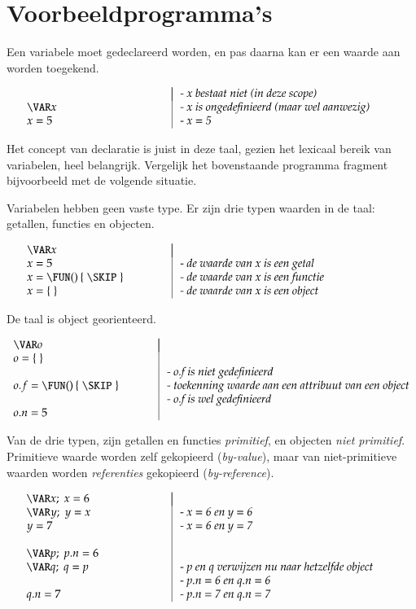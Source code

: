 \documentclass
  [11pt,
   paper=a4,
   cleardouble=plain,
   chapterprefix=true,
   parskip=half]
  {scrbook}
\makeatletter
\newcommand{\<}
  {\ensuremath{\langle}}
\renewcommand{\>}
  {\ensuremath{\rangle}}
\newenvironment{SyntaxExample}{%
\vspace{-1.6pc}%
	\begin{equation*}%
		\begin{array}{l@{\hspace*{.02\textwidth}}|@{\hspace*{.02\textwidth}}l}%
		\hspace*{.35\textwidth} & \hspace*{.55\textwidth} \\[-1pc]%
}{%
		\end{array}%
	\end{equation*}%
\vspace{-.6pc}%
}
\makeatother
\begin{document}
\section{Voorbeeldprogramma's}

Een variabele moet gedeclareerd worden, en pas daarna kan er een waarde aan worden toegekend.

	\begin{SyntaxExample}
		& \textit{- x bestaat niet (in deze scope)} \\
		\VAR x & \textit{- x is ongedefinieerd (maar wel aanwezig)} \\
		x = 5 & \textit{- x = 5}
	\end{SyntaxExample}

Het concept van declaratie is juist in deze taal, gezien het lexicaal bereik van variabelen, heel belangrijk. Vergelijk het bovenstaande programma fragment bijvoorbeeld met de volgende situatie.

Variabelen hebben geen vaste type. Er zijn drie typen waarden in de taal: getallen, functies en objecten.

	\begin{SyntaxExample}
		\VAR x \\
		x = 5 & \textit{- de waarde van } x \textit{ is een getal} \\
		x = \FUN()\,\{\;\SKIP\;\} & \textit{- de waarde van x is een functie} \\
		x = \{\;\} & \textit{- de waarde van x is een object}
	\end{SyntaxExample}

De taal is object georienteerd.

	\begin{SyntaxExample}
		\VAR o \\
		o = \{\;\} \\
		& \textit{- o.f is niet gedefinieerd} \\
		o.f = \FUN()\,\{\;\SKIP\;\} & \textit{- toekenning waarde aan een attribuut van een object} \\
		& \textit{- o.f is wel gedefinieerd} \\
		o.n = 5 &
	\end{SyntaxExample}

Van de drie typen, zijn getallen en functies \emph{primitief}, en objecten \emph{niet primitief}. Primitieve waarde worden zelf gekopieerd (\emph{by-value}), maar van niet-primitieve waarden worden \emph{referenties} gekopieerd (\emph{by-reference}).

	\begin{SyntaxExample}
		\VAR x;\; x = 6 \\
		\VAR y;\; y = x & \textit{- x = 6 en y = 6} \\
		y = 7 & \textit{- x = 6 en y = 7} \\
		\\
		\VAR p;\; p.n = 6 \\
		\VAR q;\; q = p & \textit{- p en q verwijzen nu naar hetzelfde object} \\
		& \textit{- p.n = 6 en q.n = 6} \\
		q.n = 7 & \textit{- p.n = 7 en q.n = 7}
	\end{SyntaxExample}
\end{document}
